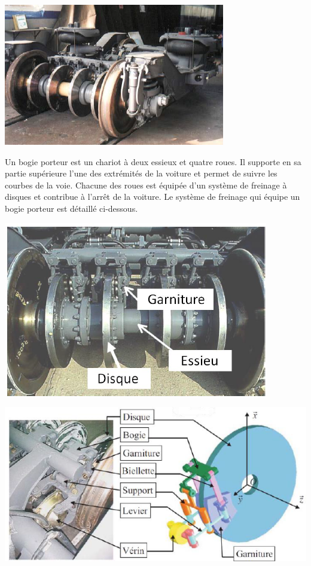 \documentclass[10pt,fleqn]{article} %
\begin{document}
\begin{multicols}{2}
\begin{center}
\includegraphics[width=\linewidth]{images/fig_03.png}
\end{center}

Un bogie porteur est un chariot à deux essieux et quatre roues.
Il supporte en sa partie supérieure l’une des extrémités de la
voiture et permet de suivre les courbes de la voie.
Chacune des roues est équipée d’un système de freinage à
disques et contribue à l’arrêt de la voiture.
Le système de freinage qui équipe un bogie porteur est détaillé
ci-dessous.

\begin{center}
\includegraphics[width=\linewidth]{images/fig_04.png}
\end{center}


\begin{center}
\includegraphics[width=\linewidth]{images/fig_05.png}
\end{center}


\end{multicols}
\end{document}
